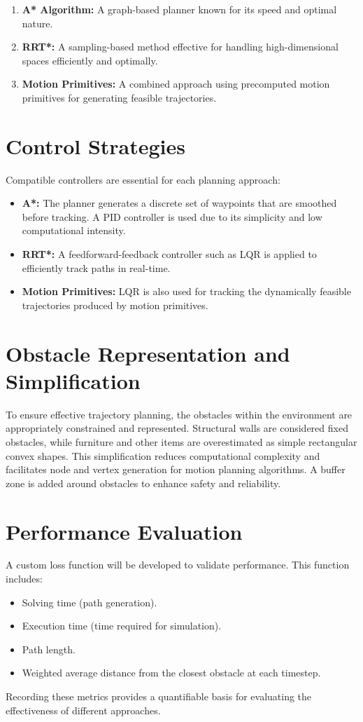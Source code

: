 \documentclass[a4paper, 11pt, conference]{ieeeconf}      %
\begin{document}
\begin{enumerate}
    \item \textbf{A* Algorithm:} A graph-based planner known for its speed and optimal nature.
    \item \textbf{RRT*:} A sampling-based method effective for handling high-dimensional spaces efficiently and optimally.
    \item \textbf{Motion Primitives:} A combined approach using precomputed motion primitives for generating feasible trajectories.
\end{enumerate}

\section{Control Strategies}
Compatible controllers are essential for each planning approach:
\begin{itemize}
    \item \textbf{A*:} The planner generates a discrete set of waypoints that are smoothed before tracking. A PID controller is used due to its simplicity and low computational intensity.
    \item \textbf{RRT*:} A feedforward-feedback controller such as LQR is applied to efficiently track paths in real-time.
    \item \textbf{Motion Primitives:} LQR is also used for tracking the dynamically feasible trajectories produced by motion primitives.
\end{itemize}

\section{Obstacle Representation and Simplification}
To ensure effective trajectory planning, the obstacles within the environment are appropriately constrained and represented. Structural walls are considered fixed obstacles, while furniture and other items are overestimated as simple rectangular convex shapes. This simplification reduces computational complexity and facilitates node and vertex generation for motion planning algorithms. A buffer zone is added around obstacles to enhance safety and reliability.

\section{Performance Evaluation}
A custom loss function will be developed to validate performance. This function includes:
\begin{itemize}
    \item Solving time (path generation).
    \item Execution time (time required for simulation).
    \item Path length.
    \item Weighted average distance from the closest obstacle at each timestep.
\end{itemize}
Recording these metrics provides a quantifiable basis for evaluating the effectiveness of different approaches.
\end{document}
